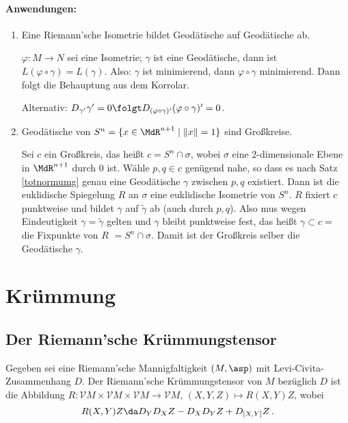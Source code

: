 \documentclass[a4paper,twoside,DIV15,BCOR12mm]{scrbook}
\newcommand{\V}{\mathcal V}
\begin{document}
\subsubsection*{Anwendungen:}
\begin{enumerate}
\item Eine Riemann’sche Isometrie bildet Geodätische auf Geodätische ab.
\begin{beweis}
$\varphi: M \to N$ sei eine Isometrie; $\gamma$ ist eine Geodätische, dann ist $L(\varphi \circ \gamma) = L(\gamma)$. Also: $\gamma$ ist minimierend, dann $\varphi\circ \gamma$ minimierend. Dann folgt die Behauptung aus dem Korrolar.

Alternativ: $D_{\gamma'}{\gamma'} = 0 \folgt D_{(\varphi\circ \gamma)'}(\varphi\circ\gamma)' = 0$.
\end{beweis}
\item Geodätische von $S^n=\{x \in \MdR^{n+1}\mid \|x\| = 1\}$ sind Großkreise.
\begin{beweis}
Sei $c$ ein Großkreis, das heißt $c = S^n \cap \sigma$, wobei $\sigma$ eine 2-dimensionale Ebene in $\MdR^{n+1}$ durch 0 ist. Wähle $p,q\in c$ genügend nahe, so dass es nach Satz \ref{totnormumg} genau eine Geodätische $\gamma$ zwischen $p,q$ existiert. Dann ist die euklidische Spiegelung $R$ an $\sigma$ eine euklidische Isometrie von $S^n$. $R$ fixiert $c$ punktweise und bildet $\gamma$  auf $\tilde\gamma$ ab (auch durch $p,q$). Also mus wegen Eindeutigkeit $\gamma = \tilde \gamma$ gelten und $\gamma$ bleibt punktweise fest, das heißt $\gamma\subset c = $ die Fixpunkte von $R$ $= S^n\cap \sigma$. Damit ist der Großkreis selber die Geodätische $\gamma$.
\end{beweis}
\end{enumerate}

\chapter{Krümmung}


\section{Der Riemann’sche Krümmungstensor}

Gegeben sei eine Riemann’sche Mannigfaltigkeit $(M,\asp)$ mit Levi-Civita-Zusammenhang $D$. Der Riemann’sche Krümmungstensor von $M$ bezüglich $D$ ist die Abbildung $R:\V M\times \V M \times \V M \to \V M$, $(X,Y,Z) \mapsto R(X,Y)Z$, wobei \[R(X,Y)Z \da D_YD_XZ - D_XD_YZ + D_{[X,Y]}Z\,.\]
\end{document}
